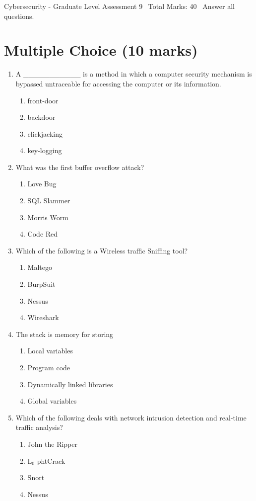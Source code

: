 \documentclass[12pt]{article}
\begin{document}
\begin{center}
Cybersecurity - Graduate Level Assessment 9 \
Total Marks: 40 \
Answer all questions.
\end{center}

\section*{Multiple Choice (10 marks)}
\begin{enumerate}[label=\arabic*.]
\item A \_\_\_\_\_\_\_\_\_\_\_ is a method in which a computer security mechanism is bypassed untraceable for accessing the computer or its information.
\begin{enumerate}[label=(\alph*)]
    \item front-door
    \item backdoor
    \item clickjacking
    \item key-logging
\end{enumerate}
\item What was the first buffer overflow attack?
\begin{enumerate}[label=(\alph*)]
    \item Love Bug
    \item SQL Slammer
    \item Morris Worm
    \item Code Red
\end{enumerate}
\item Which of the following is a Wireless traffic Sniffing tool?
\begin{enumerate}[label=(\alph*)]
    \item Maltego
    \item BurpSuit
    \item Nessus
    \item Wireshark
\end{enumerate}
\item The stack is memory for storing
\begin{enumerate}[label=(\alph*)]
    \item Local variables
    \item Program code
    \item Dynamically linked libraries
    \item Global variables
\end{enumerate}
\item Which of the following deals with network intrusion detection and real-time traffic analysis?
\begin{enumerate}[label=(\alph*)]
    \item John the Ripper
    \item L$_{0}$ phtCrack
    \item Snort
    \item Nessus
\end{enumerate}
\end{enumerate}
\end{document}
